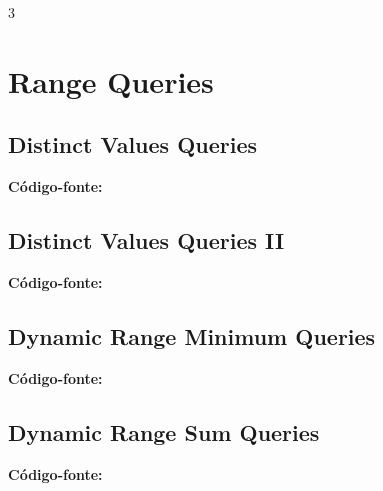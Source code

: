 \documentclass[8pt]{extarticle}
\begin{document}
\pagebreak
\begin{multicols*}{3}

\section{Range Queries}

\subsection{Distinct Values Queries}
\begin{caixaenunciado}

\end{caixaenunciado}
\vspace{0.3cm}
\noindent\textbf{Código-fonte:}


\subsection{Distinct Values Queries II}
\begin{caixaenunciado}

\end{caixaenunciado}
\vspace{0.3cm}
\noindent\textbf{Código-fonte:}


\subsection{Dynamic Range Minimum Queries}
\begin{caixaenunciado}

\end{caixaenunciado}
\vspace{0.3cm}
\noindent\textbf{Código-fonte:}


\subsection{Dynamic Range Sum Queries}
\begin{caixaenunciado}

\end{caixaenunciado}
\vspace{0.3cm}
\noindent\textbf{Código-fonte:}



\end{multicols*}
\end{document}
